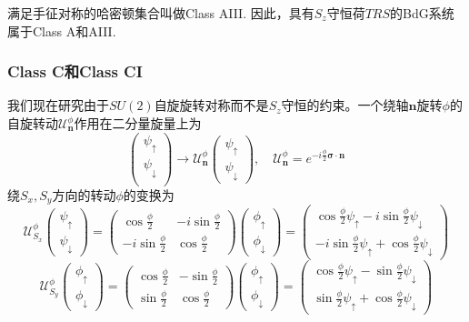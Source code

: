 \documentclass[a4paper]{article}
\numberwithin{equation}{subsection}
\newcommand{\mU}{\mathcal{U}}
\begin{document}
满足手征对称的哈密顿集合叫做Class AIII. 因此，具有$S_z$守恒荷$TRS$的BdG系统属于Class A和AIII.
\subsubsection{Class C和Class CI}
我们现在研究由于$SU(2)$自旋旋转对称而不是$S_z$守恒的约束。一个绕轴$\mathbf{n}$旋转$\phi$的自旋转动$\mU_{\mathbf{n}}^\phi$作用在二分量旋量上为
\begin{equation}
    \begin{pmatrix}
        \psi_\uparrow\\
        \psi_\downarrow\\
    \end{pmatrix}\rightarrow\mU_{\mathbf{n}}^\phi\begin{pmatrix}
        \psi_\uparrow\\
        \psi_\downarrow
    \end{pmatrix},\quad \mU_{\mathbf{n}}^{\phi}=e^{-i\frac{\phi}{2}\mathbf{\sigma}\cdot\mathbf{n}}
\end{equation}
绕$S_x,S_y$方向的转动$\phi$的变换为
\begin{equation}
    \mU_{S_x}^\phi\begin{pmatrix}
        \psi_{\uparrow}\\
        \psi_{\downarrow}
    \end{pmatrix}=\begin{pmatrix}
        \cos\frac{\phi}{2}&-i\sin\frac{\phi}{2}\\
        -i\sin\frac{\phi}{2}&\cos\frac{\phi}{2}
    \end{pmatrix}\begin{pmatrix}
        \phi_\uparrow\\
        \phi_\downarrow
    \end{pmatrix}=\begin{pmatrix}
        \cos\frac{\phi}{2}\psi_\uparrow-i\sin\frac{\phi}{2}\psi_\downarrow\\
        -i\sin\frac{\phi}{2}\psi_\uparrow+\cos\frac{\phi}{2}\psi_\downarrow
    \end{pmatrix}
\end{equation}
\begin{equation}
    \mU_{S_y}^\phi\begin{pmatrix}
        \phi_\uparrow\\
        \phi_\downarrow
    \end{pmatrix}=\begin{pmatrix}
        \cos\frac{\phi}{2}&-\sin\frac{\phi}{2}\\
        \sin\frac{\phi}{2}&\cos\frac{\phi}{2}
    \end{pmatrix}\begin{pmatrix}
        \phi_\uparrow\\
        \phi_\downarrow
    \end{pmatrix}=\begin{pmatrix}
        \cos\frac{\phi}{2}\psi_\uparrow-\sin\frac{\phi}{2}\psi_\downarrow\\
        \sin\frac{\phi}{2}\psi_\uparrow+\cos\frac{\phi}{2}\psi_\downarrow
    \end{pmatrix}
\end{equation}
\end{document}

